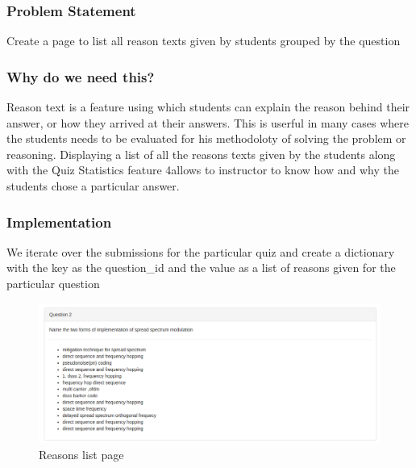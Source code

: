 \subsubsection{Problem Statement}
	Create a page to list all reason texts given by students grouped by the question

\subsubsection{Why do we need this?}
	Reason text is a feature using which students can explain the reason behind their answer, or how they arrived at their answers. This is userful in many cases where the students needs to be evaluated for his methodoloty of solving the problem or reasoning. Displaying a list of all the reasons texts given by the students along with the Quiz Statistics feature 4allows to instructor to know how and why the students chose a particular answer.

\subsubsection{Implementation}
	We iterate over the submissions for the particular quiz and create a dictionary with the key as the question_id and the value as a list of reasons given for the particular question	

\begin{figure}[h!]
\begin{center}
\includegraphics[scale=.4]{diagrams/reasons-list} 
\vspace{1cm}
\caption{Reasons list page}
\end{center}
\end{figure}